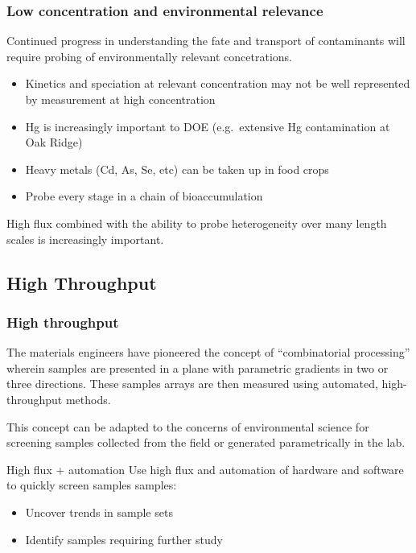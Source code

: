 \documentclass[10pt, xcolor=x11names, compress]{beamer}
\begin{document}
\begin{frame}
  \frametitle{Low concentration and environmental relevance}%
  \begin{block}{}
    Continued progress in understanding the fate and transport of
    contaminants will require probing of environmentally relevant
    concetrations.
  \end{block}
  \begin{itemize}
  \item Kinetics and speciation at relevant concentration may not be
    well represented by measurement at high concentration
  \item Hg is increasingly important to DOE (e.g.\ extensive Hg
    contamination at Oak Ridge)
  \item Heavy metals (Cd, As, Se, etc) can be taken up in food crops
  \item Probe every stage in a chain of bioaccumulation
  \end{itemize}
  \begin{alertblock}{}
    High flux combined with the ability to probe heterogeneity over
    many length scales is increasingly important.
  \end{alertblock}
\end{frame}

\subsection[High throughput]{High Throughput}

\begin{frame}
  \frametitle{High throughput}

  The materials engineers have pioneered the concept of
  ``combinatorial processing'' wherein samples are presented in a
  plane with parametric gradients in two or three directions.  These
  samples arrays are then measured using automated, high-throughput
  methods.

  \bigskip

  This concept can be adapted to the concerns of environmental science
  for screening samples collected from the field or generated
  parametrically in the lab.

  \bigskip

  \begin{block}{High flux + automation}
    Use high flux and automation of hardware and software to quickly
    screen samples samples:
    \begin{itemize}
    \item Uncover trends in sample sets
    \item Identify samples requiring further study
    \end{itemize}
  \end{block}
\end{frame}
\end{document}

